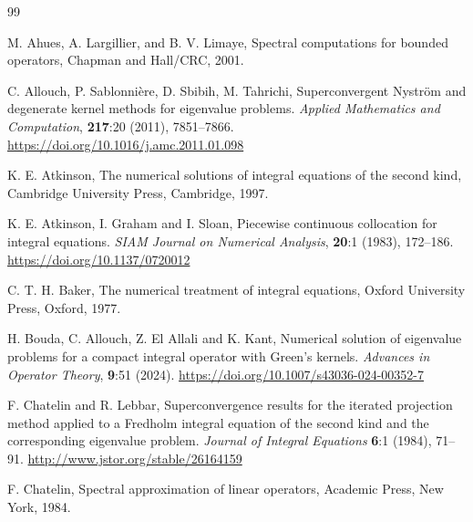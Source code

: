\documentclass[pdflatex, sn-mathphys-num]{sn-jnl}%
\theoremstyle{thmstyleone}%
\theoremstyle{thmstyletwo}%
\theoremstyle{thmstylethree}%
\begin{document}
\begin{thebibliography}{99}
	
	M. Ahues, A. Largillier, and B. V. Limaye, Spectral computations for bounded operators, Chapman and Hall/CRC, 2001.
	
	C. Allouch, P. Sablonni\`ere, D. Sbibih, M. Tahrichi, Superconvergent Nystr\"om and
	degenerate kernel methods for eigenvalue problems. \textit{Applied Mathematics and Computation}, \textbf{217}:20 (2011), 7851--7866.
	\url{https://doi.org/10.1016/j.amc.2011.01.098}
	
	
	K. E. Atkinson, The numerical solutions of integral equations of the second kind, Cambridge University Press, Cambridge, 1997.
	
	K. E. Atkinson, I. Graham and I. Sloan, Piecewise continuous collocation for
	integral equations. \textit{SIAM Journal on Numerical Analysis}, \textbf{20}:1 (1983), 172--186.
	\url{https://doi.org/10.1137/0720012}
	
	C. T. H. Baker, The numerical treatment of integral equations, Oxford University Press, Oxford, 1977.
	
	
	H. Bouda, C. Allouch, Z. El Allali and K. Kant, Numerical solution of eigenvalue problems for a compact integral operator with Green's kernels. \textit{Advances in Operator Theory}, \textbf{9}:51 (2024).  
	\url{https://doi.org/10.1007/s43036-024-00352-7}
	
	F. Chatelin and R. Lebbar, Superconvergence results for the iterated projection method applied to a Fredholm integral equation of the second kind and the corresponding eigenvalue problem. \textit{Journal of Integral Equations} \textbf{6}:1 (1984), 71--91. 
	\url{http://www.jstor.org/stable/26164159}
	
	F. Chatelin, Spectral approximation of linear operators, Academic Press, New York, 1984.
	
	

\end{thebibliography}
\end{document}
